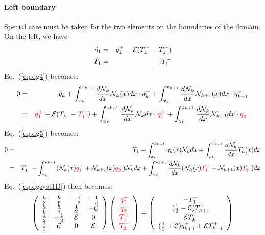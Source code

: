 \paragraph{Left boundary}
Special care must be taken for the two elements on the boundaries of the domain. 
On the left, we have 
\begin{eqnarray}
\hat{q}_1 &=& q_1^+ -{\cal E} (T_1^--T_1^+) \nonumber  \\
\hat{T}_1 &=& T_1^- \nonumber
\end{eqnarray}
Eq.~(\ref{eq:dg4}) becomes:
\begin{eqnarray}
0 
&=& \hat{q}_k   
+ \int_{x_k}^{x_{k+1}} \frac{d{\mathcal{N}}_k}{dx} {\mathcal{N}}_k(x) dx \cdot q_k^+ 
+ \int_{x_k}^{x_{k+1}} \frac{d{\mathcal{N}}_k}{dx} {\mathcal{N}}_{k+1}(x) dx \cdot q_{k+1}^- \nonumber\\ 
&=& 
{\color{red}q_1^+} - {\cal E} (T_k^- - {\color{red}T_1^+}) 
+ \int_{x_k}^{x_{k+1}} \frac{d{\mathcal{N}}_k}{dx} {\mathcal{N}}_k dx \cdot {\color{red}q_1^+ }
+ \int_{x_k}^{x_{k+1}} \frac{d{\mathcal{N}}_k}{dx} {\mathcal{N}}_{k+1} dx \cdot {\color{red} q_{2}^-}
\end{eqnarray}
Eq.~(\ref{eq:dg5}) becomes:
\begin{eqnarray}
0
&=& \hat{T}_1     
+ \int_{x_k}^{x_{k+1}}  q_h(x) {\mathcal{N}}_k dx
+ \int_{x_k}^{x_{k+1}} \frac{d{\mathcal{N}}_k}{dx} T_h(x) dx  \nonumber\\
&=& 
T_1^-  
+ \int_{x_k}^{x_{k+1}}  ({\mathcal{N}}_k(x) {\color{red}q_1^+} + {\mathcal{N}}_{k+1}(x) {\color{red}q_{2}^-}) {\mathcal{N}}_k dx
+ \int_{x_k}^{x_{k+1}} \frac{d{\mathcal{N}}_k}{dx} ({\mathcal{N}}_k(x) {\color{red}T_1^+} + {\mathcal{N}}_{k+1}(x) {\color{red}T_{2}^-})   dx 
\end{eqnarray}
Eq.~(\ref{eq:dgsyst1D}) then becomes:
\begin{eqnarray}
\left(
\begin{array}{cccc}
\frac{h}{3}    &  \frac{h}{6} & -\frac{1}{2}   &-\frac{1}{2} \\
\frac{h}{6}    &  \frac{h}{3} & \frac{1}{2} & -{\cal C} \\
\frac{1}{2}    & -\frac{1}{2} & {\cal E} & 0\\
\frac{1}{2} & {\cal C} & 0 & {\cal E}
\end{array}
\right) \left(
\begin{array}{c}
     \color{red}{q_1^+}  \\
     \color{red}{q_{2}^-} \\
     \color{red}{T_1^+} \\
     \color{red}{T_{2}^-}
\end{array}
\right)=\left(
\begin{array}{c}
     -T_1^-  \\
      (\frac{1}{2}-{\cal{C}}) T_{k+1}^+ \\
     {\cal{E}} T_k^-  \\
      (\frac{1}{2}+{\cal{C}})q_{k+1}^++{\cal{E}} T_{k+1}^+
\end{array}
\right)
\label{eq:dgsyst1Dleft}
\end{eqnarray}








